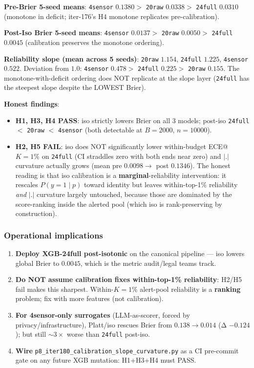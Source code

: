 \documentclass{article}
\begin{document}
\textbf{Pre-Brier 5-seed means}: \texttt{4sensor} $0.1380 >$
\texttt{20raw} $0.0338 >$ \texttt{24full} $0.0310$ (monotone in
deficit; iter-176's H4 monotone replicates pre-calibration).

\textbf{Post-Iso Brier 5-seed means}: \texttt{4sensor} $0.0137 >$
\texttt{20raw} $0.0050 >$ \texttt{24full} $0.0045$ (calibration
preserves the monotone ordering).

\textbf{Reliability slope (mean across 5 seeds)}: \texttt{20raw}
$1.154$, \texttt{24full} $1.225$, \texttt{4sensor} $0.522$.
Deviation from $1.0$: \texttt{4sensor} $0.478 >$ \texttt{24full}
$0.225 >$ \texttt{20raw} $0.155$. The monotone-with-deficit
ordering does NOT replicate at the slope layer (\texttt{24full} has
the steepest slope despite the LOWEST Brier).

\textbf{Honest findings}:
\begin{itemize}
\item \textbf{H1, H3, H4 PASS}: iso strictly lowers Brier on all 3
  models; post-iso \texttt{24full} $<$ \texttt{20raw} $<$
  \texttt{4sensor} (both detectable at $B{=}2000$, $n{=}10000$).
\item \textbf{H2, H5 FAIL}: iso does NOT significantly lower
  within-budget ECE@$K{=}1\%$ on \texttt{24full} (CI straddles zero
  with both ends near zero) and $|.|$ curvature actually grows
  (mean pre $0.0098 \to$ post $0.1346$). The honest reading is that
  iso calibration is a \textbf{marginal}-reliability intervention:
  it rescales $P(y{=}1\mid p)$ toward identity but leaves
  within-top-1\% reliability \emph{and} $|.|$ curvature largely
  untouched, because those are dominated by the score-ranking
  inside the alerted pool (which iso is rank-preserving by
  construction).
\end{itemize}

\subsubsection{Operational implications}
\begin{enumerate}
\item \textbf{Deploy XGB-24full post-isotonic} on the canonical
  pipeline — iso lowers global Brier to $0.0045$, which is the
  metric audit/legal teams track.
\item \textbf{Do NOT assume calibration fixes within-top-1\%
  reliability}: H2/H5 fail makes this sharpest. Within-$K{=}1\%$
  alert-pool reliability is a \textbf{ranking} problem; fix
  with more features (not calibration).
\item \textbf{For 4sensor-only surrogates} (LLM-as-scorer,
  forced by privacy/infrastructure), Platt/iso rescues Brier
  from $0.138 \to 0.014$ (Δ $-0.124$); but still $\sim 3\times$
  worse than \texttt{24full} post-iso.
\item \textbf{Wire} \texttt{p8\_iter180\_calibration\_slope\_curvature.py}
  as a CI pre-commit gate on any future XGB mutation: H1+H3+H4
  must PASS.
\end{enumerate}
\end{document}
